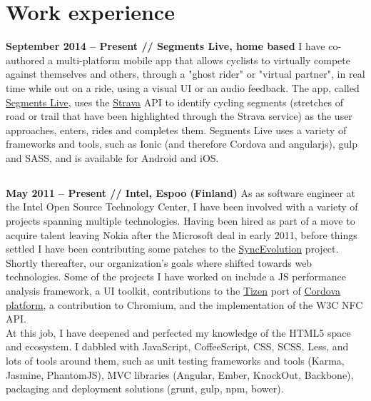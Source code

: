 \documentclass[10pt]{tccv}
\begin{document}
		\section{Work experience}
			\textbf{September 2014 -- Present // Segments Live, home based}
				I have co-authored a multi-platform mobile app that allows
				cyclists to virtually compete against themselves and others,
				through a "ghost rider" or "virtual partner", in real time
				while out on a ride, using a visual UI or an audio feedback.
				The app, called \href{http://segmentsliveapp.com}{Segments
				Live}, uses the \href{http://strava.com}{Strava} API to
				identify cycling segments (stretches of road or trail that have
				been highlighted through the Strava service) as the user
				approaches, enters, rides and completes them. Segments Live
				uses a variety of frameworks and tools, such as Ionic (and
				therefore Cordova and angularjs), gulp and SASS, and is
				available for Android and iOS.

			\subsection{}
				\textbf{May 2011 -- Present // Intel, Espoo (Finland)}
				As as software engineer at the Intel Open Source Technology
				Center, I have been involved with a variety of projects
				spanning multiple technologies. Having been hired as part of a
				move to acquire talent leaving Nokia after the Microsoft deal
				in early 2011, before things settled I have been contributing
				some patches to the
				\href{https://syncevolution.org/}{SyncEvolution} project.\\

				Shortly thereafter, our organization's goals where shifted
				towards web technologies. Some of the projects I have worked on
				include a JS performance analysis framework, a UI toolkit,
				contributions to the \href{http://tizen.org}{Tizen} port of
				\href{http://cordova.apache.org/}{Cordova platform}, a
				contribution to Chromium, and the implementation of the W3C NFC
				API.\\
				
				At this job, I have deepened and perfected my knowledge of the
				HTML5 space and ecosystem. I dabbled with JavaScript,
				CoffeeScript, CSS, SCSS, Less, and lots of tools around them,
				such as unit testing frameworks and tools (Karma, Jasmine,
				PhantomJS), MVC libraries (Angular, Ember, KnockOut, Backbone),
				packaging and deployment solutions (grunt, gulp, npm, bower).
\end{document}
